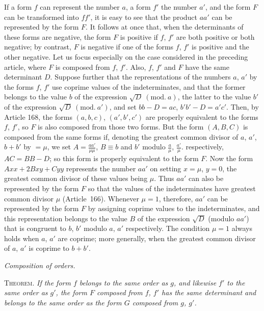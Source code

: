 If a form $f$ can represent the number $a$, a form $f'$ the number $a'$, and the form $F$ can be transformed into $ff'$, it is easy to see that the product $aa'$ can be represented by the form $F$. It follows at once that, when the determinants of these forms are negative, the form $F$ is positive if $f$, $f'$ are both positive or both negative; by contrast, $F$ is negative if one of the forms $f$, $f'$ is positive and the other negative. Let us focus especially on the case considered in the preceding article, where $F$ is composed from $f$, $f'$. Also, $f$, $f'$ and $F$ have the same determinant $D$. Suppose further that the representations of the numbers $a$, $a'$ by the forms $f$, $f'$ use coprime values of the indeterminates, and that the former belongs to the value $b$ of the expression $\surd D\ (\mathrm{mod.}\ a)$, the latter to the value $b'$ of the expression $\surd D\ (\mathrm{mod.}\ a')$, and set $bb-D=ac$, $b'b'-D=a'c'$. Then, by Article 168, the forms $(a,b,c)$, $(a',b',c')$ are properly equivalent to the forms $f$, $f'$, so $F$ is also composed from those two forms. But the form $(A,B,C)$ is composed from the same forms if, denoting the greatest common divisor of $a$, $a'$, $b+b'$ by $=\mu$, we set $A=\frac{aa'}{\mu\mu}$, $B\equiv b$ and $b'$ modulo $\frac{a}{\mu}$, $\frac{a'}{\mu}$. respectively,
$AC=BB-D$; so this form is properly equivalent to the form $F$. Now the form $Axx+2Bxy+Cyy$ represents the number $aa'$ on setting $x=\mu$, $y=0$, the greatest common divisor of these values being $\mu$. Thus $aa'$ can also be represented by the form $F$ so that the values of the indeterminates have greatest common divisor $\mu$ (Article~166). Whenever $\mu=1$, therefore, $aa'$ can be represented by the form $F$ by assigning coprime values to the indeterminates, and this representation belongs to the value $B$ of the expression $\surd D$ (modulo $aa'$) that is congruent to $b$, $b'$ modulo $a$, $a'$ respectively. The condition $\mu=1$ always holds when $a$, $a'$ are coprime; more generally, when the greatest common divisor of $a$, $a'$ is coprime to $b+b'$.

\begin{center}
\textit{Composition of orders.}
\end{center}

\textsc{Theorem.} \textit{If the form $f$ belongs to the same order as $g$, and likewise $f'$ to the same order as $g'$, the form $F$ composed from $f$, $f'$ has the same determinant and belongs to the same order as the form $G$ composed from $g$, $g'$.}

